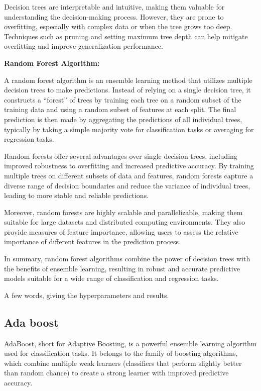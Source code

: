 \documentclass[preprint,aps,nofootinbib,a4paper,superscriptaddress,longbibliography,amsfonts,amssymb,amsmath,titlepage]{revtex4-2}
\begin{document}
Decision trees are interpretable and intuitive, making them valuable for understanding the decision-making process. However, they are prone to overfitting, especially with complex data or when the tree grows too deep. Techniques such as pruning and setting maximum tree depth can help mitigate overfitting and improve generalization performance.

\textbf{Random Forest Algorithm:}

A random forest algorithm is an ensemble learning method that utilizes multiple decision trees to make predictions. Instead of relying on a single decision tree, it constructs a ``forest'' of trees by training each tree on a random subset of the training data and using a random subset of features at each split. The final prediction is then made by aggregating the predictions of all individual trees, typically by taking a simple majority vote for classification tasks or averaging for regression tasks.

Random forests offer several advantages over single decision trees, including improved robustness to overfitting and increased predictive accuracy. By training multiple trees on different subsets of data and features, random forests capture a diverse range of decision boundaries and reduce the variance of individual trees, leading to more stable and reliable predictions.

Moreover, random forests are highly scalable and parallelizable, making them suitable for large datasets and distributed computing environments. They also provide measures of feature importance, allowing users to assess the relative importance of different features in the prediction process.

In summary, random forest algorithms combine the power of decision trees with the benefits of ensemble learning, resulting in robust and accurate predictive models suitable for a wide range of classification and regression tasks.

A few words, giving the hyperparameters and results.


\subsection{Ada boost}

AdaBoost, short for Adaptive Boosting, is a powerful ensemble learning algorithm used for classification tasks. It belongs to the family of boosting algorithms, which combine multiple weak learners (classifiers that perform slightly better than random chance) to create a strong learner with improved predictive accuracy.
\end{document}
